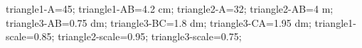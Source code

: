 \documentclass[exercice]{thedocument}%
\begin{document}
%
\>triangle1-A=45;%
\>triangle1-AB=4.2 cm;%
\>triangle2-A=32;%
\>triangle2-AB=4 m;%
\>triangle3-AB=0.75 dm;%
\>triangle3-BC=1.8 dm;%
\>triangle3-CA=1.95 dm;%
\>triangle1-scale=0.85;%
\>triangle2-scale=0.95;%
\>triangle3-scale=0.75;%
%
\end{document}
